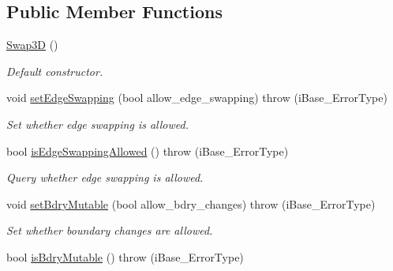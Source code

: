 \subsection*{Public Member Functions}
\begin{DoxyCompactItemize}
\item 
\hyperlink{class_i_t_a_p_s___swap_1_1_swap3_d_acf6445ad45f957369eb20b0671bfd5ba}{Swap3D} ()
\begin{DoxyCompactList}\small\item\em Default constructor. \item\end{DoxyCompactList}\item 
\hypertarget{class_i_t_a_p_s___swap_1_1_swap3_d_a2122e59297538a3489eeb3dd74a2d482}{
void \hyperlink{class_i_t_a_p_s___swap_1_1_swap3_d_a2122e59297538a3489eeb3dd74a2d482}{setEdgeSwapping} (bool allow\_\-edge\_\-swapping)  throw (iBase\_\-ErrorType)}
\label{class_i_t_a_p_s___swap_1_1_swap3_d_a2122e59297538a3489eeb3dd74a2d482}

\begin{DoxyCompactList}\small\item\em Set whether edge swapping is allowed. \item\end{DoxyCompactList}\item 
\hypertarget{class_i_t_a_p_s___swap_1_1_swap3_d_a4ce9a3eb26e6be61d006f51fa8720999}{
bool \hyperlink{class_i_t_a_p_s___swap_1_1_swap3_d_a4ce9a3eb26e6be61d006f51fa8720999}{isEdgeSwappingAllowed} ()  throw (iBase\_\-ErrorType)}
\label{class_i_t_a_p_s___swap_1_1_swap3_d_a4ce9a3eb26e6be61d006f51fa8720999}

\begin{DoxyCompactList}\small\item\em Query whether edge swapping is allowed. \item\end{DoxyCompactList}\item 
\hypertarget{class_i_t_a_p_s___swap_1_1_swap3_d_afe3ed257e355aaac22b281a24b35637c}{
void \hyperlink{class_i_t_a_p_s___swap_1_1_swap3_d_afe3ed257e355aaac22b281a24b35637c}{setBdryMutable} (bool allow\_\-bdry\_\-changes)  throw (iBase\_\-ErrorType)}
\label{class_i_t_a_p_s___swap_1_1_swap3_d_afe3ed257e355aaac22b281a24b35637c}

\begin{DoxyCompactList}\small\item\em Set whether boundary changes are allowed. \item\end{DoxyCompactList}\item 
\hypertarget{class_i_t_a_p_s___swap_1_1_swap3_d_a59dfdb2933f976acb278d6849ab8f90e}{
bool \hyperlink{class_i_t_a_p_s___swap_1_1_swap3_d_a59dfdb2933f976acb278d6849ab8f90e}{isBdryMutable} ()  throw (iBase\_\-ErrorType)}
\label{class_i_t_a_p_s___swap_1_1_swap3_d_a59dfdb2933f976acb278d6849ab8f90e}


\end{DoxyCompactItemize}
